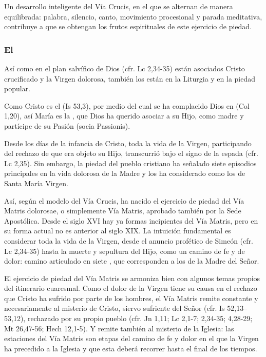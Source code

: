 \begin{introstyle}
Un desarrollo inteligente del Vía Crucis, en el que se alternan de manera equilibrada: palabra, silencio, canto, movimiento procesional y parada meditativa, contribuye a que se obtengan los frutos espirituales de este ejercicio de piedad.

\newpage
\subsubsection{El }

Así como en el plan salvífico de Dios (cfr. Lc 2,34-35) están asociados Cristo crucificado y la Virgen dolorosa, también los están en la Liturgia y en la piedad popular.

Como Cristo es el  (Is 53,3), por medio del cual se ha complacido Dios en  (Col 1,20), así María es la , que Dios ha querido asociar a su Hijo, como madre y partícipe de su Pasión (socia Passionis).

Desde los días de la infancia de Cristo, toda la vida de la Virgen, participando del rechazo de que era objeto su Hijo, transcurrió bajo el signo de la espada (cfr. Lc 2,35). Sin embargo, la piedad del pueblo cristiano ha señalado siete episodios principales en la vida dolorosa de la Madre y los ha considerado como los  de Santa María Virgen.

Así, según el modelo del Vía Crucis, ha nacido el ejercicio de piedad del Vía Matris dolorosae, o simplemente Vía Matris, aprobado también por la Sede Apostólica. Desde el siglo XVI hay ya formas incipientes del Vía Matris, pero en su forma actual no es anterior al siglo XIX. La intuición fundamental es considerar toda la vida de la Virgen, desde el anuncio profético de Simeón (cfr. Lc 2,34-35) hasta la muerte y sepultura del Hijo, como un camino de fe y de dolor: camino articulado en siete , que corresponden a los  de la Madre del Señor.

El ejercicio de piedad del Vía Matris se armoniza bien con algunos temas propios del itinerario cuaresmal. Como el dolor de la Virgen tiene su causa en el rechazo que Cristo ha sufrido por parte de los hombres, el Vía Matris remite constante y necesariamente al misterio de Cristo, siervo sufriente del Señor (cfr. Is 52,13–53,12), rechazado por su propio pueblo (cfr. Jn 1,11; Lc 2,1-7; 2,34-35; 4,28-29; Mt 26,47-56; Hech 12,1-5). Y remite también al misterio de la Iglesia: las estaciones del Vía Matris son etapas del camino de fe y dolor en el que la Virgen ha precedido a la Iglesia y que esta deberá recorrer hasta el final de los tiempos.


\end{introstyle}
